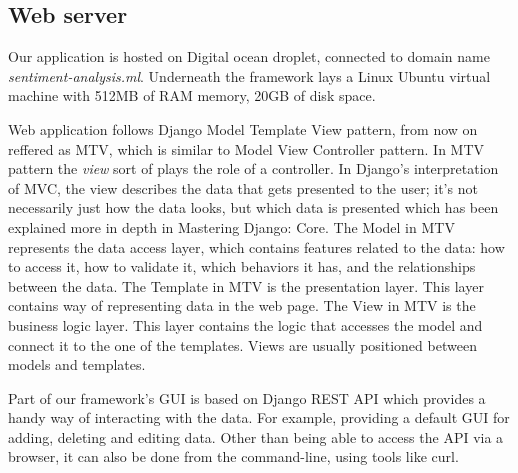 \subsection{Web server}\label{sec:web-server}

Our application is hosted on Digital ocean droplet, connected to domain name \textit{sentiment-analysis.ml}. Underneath the framework lays a Linux Ubuntu virtual machine with 512MB of RAM memory, 20GB of disk space.

Web application follows Django Model Template View pattern, from now on reffered as MTV, which is similar to Model View Controller pattern. In MTV pattern the \textit{view} sort of plays the role of a controller. In Django’s interpretation of MVC, the view describes the data that gets presented to the user; it’s not necessarily just how the data looks, but which data is presented which has been explained more in depth in Mastering Django: Core\cite{DjangoMTV}. The Model in MTV represents the data access layer, which contains features related to the data: how to access it, how to validate it, which behaviors it has, and the relationships between the data. The Template in MTV is the presentation layer. This layer contains way of representing data in the web page. The View in MTV is the business logic layer. This layer contains the logic that accesses the model and connect it to the one of the templates. Views are usually positioned between models and templates.

Part of our framework's GUI is based on Django REST API which provides a handy way of interacting with the data. For example, providing a default GUI for adding, deleting and editing data. Other than being able to access the API via a browser, it can also be done from the command-line, using tools like curl.
